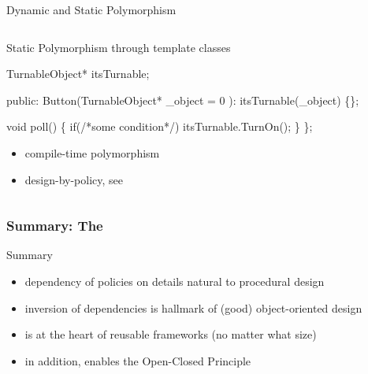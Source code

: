 \documentclass[9pt,handout]{beamer}
\begin{document}
\begin{frame}[fragile]
\begin{block}{Dynamic and Static Polymorphism}
\begin{columns}[t]
\begin{column}{.45\textwidth}
\begin{block}{Static Polymorphism through template classes}
\begin{center}
\begin{semiverbatim}
TurnableObject* itsTurnable;

public:
  Button(TurnableObject* _object = 0 ): 
    itsTurnable(_object)
    \{\};

  void poll() \{
    if(/*some condition*/)
      itsTurnable.TurnOn();
    \}
\};
              \end{semiverbatim}
          \end{center}
        \normalsize
        \begin{itemize}
        \item compile-time polymorphism
        \item design-by-policy, see \cite{alexandrescu}
        \end{itemize}
      \end{block}
    \end{column}

  \end{columns}
  \end{block}
\end{frame}

\begin{frame}
  \frametitle{Summary: The \secname}
\begin{block}{Summary}
  \begin{itemize}
  \item dependency of policies on details natural to procedural design
  \item inversion of dependencies is hallmark of (good) object-oriented design
  \item {\secname} is at the heart of reusable frameworks (no matter what size)
  \item in addition, enables the Open-Closed Principle
  \end{itemize}
\end{block}
\end{frame}
\end{document}
